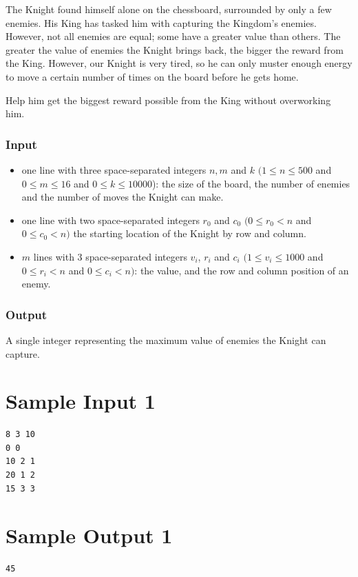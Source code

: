 
The Knight found himself alone on the chessboard, surrounded by only a few enemies. His King has tasked him with capturing the Kingdom's enemies. However,
not all enemies are equal; some have a greater value than others. The greater the value of enemies the Knight brings back, the bigger the reward from the 
King. 
However, our Knight is very tired, so he can only muster enough energy to move a certain number of times on the board before he gets home.

Help him get the biggest reward possible from the King without overworking him.

\subsubsection*{Input}

\begin{itemize}
    \item one line with three space-separated integers $n, m$ and $k$ $(1 \le n \le 500$ and $0 \le m \le 16$ and $0 \le k \le 10000$): the size of the board, the number of enemies and the number of moves the Knight can make.
    \item one line with two space-separated integers $r_0$ and $c_0$ $(0 \le r_0 < n$ and $0 \le c_0 < n)$ the starting location of the Knight by row and column.
    \item $m$ lines with 3 space-separated integers $v_i$, $r_i$ and $c_i$ $(1 \le v_i \le 1000$ and $0 \le r_i < n$ and $0 \le c_i < n)$: the value, and the row and column position of an enemy.
\end{itemize}

\subsubsection*{Output}
A single integer representing the maximum value of enemies the Knight can capture.


\section*{Sample Input 1}
\begin{verbatim}
8 3 10
0 0
10 2 1
20 1 2
15 3 3
\end{verbatim}

\section*{Sample Output 1}
\begin{verbatim}
45
\end{verbatim}



